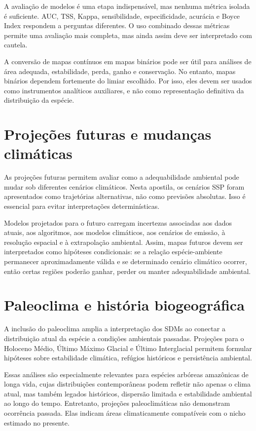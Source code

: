 \documentclass{ueap-sdm}
\begin{document}
A avaliação de modelos é uma etapa indispensável, mas nenhuma métrica isolada é suficiente. AUC, TSS, Kappa, sensibilidade, especificidade, acurácia e Boyce Index respondem a perguntas diferentes. O uso combinado dessas métricas permite uma avaliação mais completa, mas ainda assim deve ser interpretado com cautela.

A conversão de mapas contínuos em mapas binários pode ser útil para análises de área adequada, estabilidade, perda, ganho e conservação. No entanto, mapas binários dependem fortemente do limiar escolhido. Por isso, eles devem ser usados como instrumentos analíticos auxiliares, e não como representação definitiva da distribuição da espécie.

\section{Projeções futuras e mudanças climáticas}

As projeções futuras permitem avaliar como a adequabilidade ambiental pode mudar sob diferentes cenários climáticos. Nesta apostila, os cenários SSP foram apresentados como trajetórias alternativas, não como previsões absolutas. Isso é essencial para evitar interpretações determinísticas.

Modelos projetados para o futuro carregam incertezas associadas aos dados atuais, aos algoritmos, aos modelos climáticos, aos cenários de emissão, à resolução espacial e à extrapolação ambiental. Assim, mapas futuros devem ser interpretados como hipóteses condicionais: se a relação espécie-ambiente permanecer aproximadamente válida e se determinado cenário climático ocorrer, então certas regiões poderão ganhar, perder ou manter adequabilidade ambiental.

\section{Paleoclima e história biogeográfica}

A inclusão do paleoclima amplia a interpretação dos SDMs ao conectar a distribuição atual da espécie a condições ambientais passadas. Projeções para o Holoceno Médio, Último Máximo Glacial e Último Interglacial permitem formular hipóteses sobre estabilidade climática, refúgios históricos e persistência ambiental.

Essas análises são especialmente relevantes para espécies arbóreas amazônicas de longa vida, cujas distribuições contemporâneas podem refletir não apenas o clima atual, mas também legados históricos, dispersão limitada e estabilidade ambiental ao longo do tempo. Entretanto, projeções paleoclimáticas não demonstram ocorrência passada. Elas indicam áreas climaticamente compatíveis com o nicho estimado no presente.
\end{document}
